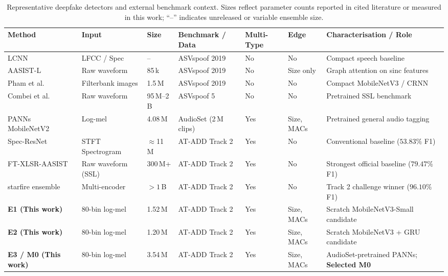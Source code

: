 \begin{table}[htbp]
\centering
\caption{Representative deepfake detectors and external benchmark context. Sizes reflect parameter counts reported in cited literature or measured in this work; ``--'' indicates unreleased or variable ensemble size.}
\label{tab:related}
\small
\setlength{\tabcolsep}{3.5pt}
\begin{adjustbox}{max width=\textwidth}
\begin{tabular}{@{}p{2.6cm}p{2.3cm}p{1.8cm}p{2.6cm}p{1.8cm}p{1.5cm}p{2.8cm}@{}}
\toprule
Method & Input & Size & Benchmark / Data & Multi-Type & Edge & Characterisation / Role \\
\midrule
LCNN~\cite{lavrentyeva2019stc} & LFCC / Spec & -- & ASVspoof 2019 & No & No & Compact speech baseline \\
AASIST-L~\cite{jung2022aasist} & Raw waveform & 85\,k & ASVspoof 2019 & No & Size only & Graph attention on sinc features \\
Pham et al.~\cite{pham2024deepfake} & Filterbank images & 1.5\,M & ASVspoof 2019 & No & No & Compact MobileNetV3 / CRNN \\
Combei et al.~\cite{combei2024wavlm} & Raw waveform & 95\,M--2\,B & ASVspoof 5 & No & No & Pretrained SSL benchmark \\
PANNs MobileNetV2~\cite{kong2020panns} & Log-mel & 4.08\,M & AudioSet (2\,M clips) & Yes & Size, MACs & Pretrained general audio tagging \\
\midrule
Spec-ResNet~\cite{xie2026atadd} & STFT Spectrogram & $\approx$11\,M & AT-ADD Track 2 & Yes & No & Conventional baseline ($53.83\%$ F1) \\
FT-XLSR-AASIST~\cite{xie2026atadd} & Raw waveform (SSL) & 300\,M+ & AT-ADD Track 2 & Yes & No & Strongest official baseline ($79.47\%$ F1) \\
starfire ensemble~\cite{xie2026atadd} & Multi-encoder & $>1$\,B & AT-ADD Track 2 & Yes & No & Track 2 challenge winner ($96.10\%$ F1) \\
\midrule
\textbf{E1 (This work)} & 80-bin log-mel & 1.52\,M & AT-ADD Track 2 & Yes & Size, MACs & Scratch MobileNetV3-Small candidate \\
\textbf{E2 (This work)} & 80-bin log-mel & 1.20\,M & AT-ADD Track 2 & Yes & Size, MACs & Scratch MobileNetV3 + GRU candidate \\
\textbf{E3 / M0 (This work)} & 80-bin log-mel & 3.54\,M & AT-ADD Track 2 & Yes & Size, MACs & AudioSet-pretrained PANNs; \textbf{Selected M0} \\
\bottomrule
\end{tabular}
\end{adjustbox}
\end{table}

